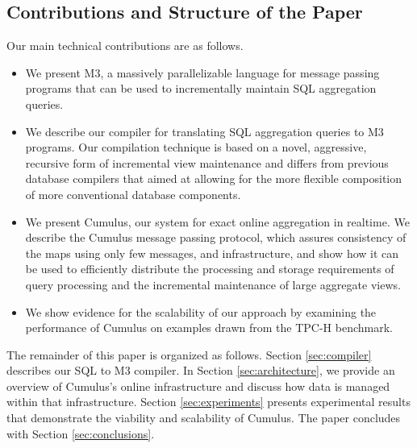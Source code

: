 \subsection{Contributions and Structure of the Paper}


Our main technical contributions are as follows.
\begin{itemize}
\item
We present M3, a massively parallelizable language
for message passing programs that can be used to incrementally maintain
SQL aggregation queries.

\item
We describe our compiler for translating SQL aggregation queries to M3
programs. Our compilation technique is based on a novel, aggressive, recursive
form of incremental view maintenance and differs from previous
database compilers \cite{DBLP:conf/pods/Batory88,DBLP:journals/jiis/BatoryT97}
that aimed at allowing for the more flexible composition of
more conventional database components.

\item
We present Cumulus, our system for exact online aggregation in realtime.
We describe the Cumulus message passing protocol, which assures
consistency of the maps using only few messages, and
infrastructure, and show how it can be used to efficiently distribute the
processing and storage requirements of query processing and
the incremental maintenance of large aggregate views.

\item We show evidence for the scalability of our approach by examining the
performance of Cumulus on examples drawn from the TPC-H\cite{tpch2008}
benchmark. 
\end{itemize}


The remainder of this paper is organized as follows.
Section \ref{sec:compiler} describes our SQL to M3 compiler.
In Section \ref{sec:architecture}, we provide an overview of Cumulus's online
infrastructure and discuss how data is managed within that infrastructure.
Section \ref{sec:experiments} presents
experimental results that demonstrate the viability and scalability of
Cumulus.
The paper concludes with Section \ref{sec:conclusions}.




